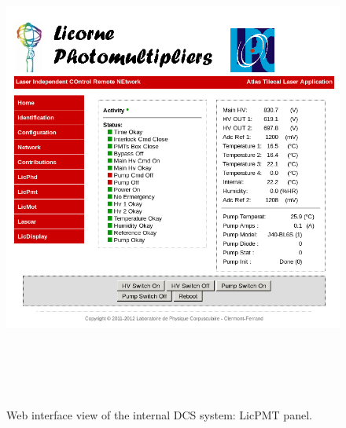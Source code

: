 \begin{appendices}
\begin{figure}[htbp]
\centering
\includegraphics[height=16cm]{figures/licorne_web2.png}
\caption{Web interface view of the internal DCS system: LicPMT panel.}\label{fig:licorne_weba}
\end{figure}



\end{appendices}
